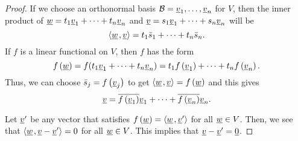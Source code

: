 \begin{proof}
If we choose an orthonormal basis $\mathcal{B} = \underline{v}_1, \ldots, \underline{v}_n$ for $V$, then the inner product of $\underline{w} = t_1 \underline{v}_1 + \cdots + t_n \underline{v}_n$ and $\underline{v} = s_1 \underline{v}_1 + \cdots + s_n \underline{v}_n$ will be
\begin{equation*}
{\left\langle  \underline{w}  \mskip2mu ,  \underline{v}  \right\rangle} = t_1 \bar{s}_1 + \cdots + t_n \bar{s}_n .
\end{equation*}
If $f$ is a linear functional on $V$, then $f$ has the form
\begin{equation*}
f \left(\underline{w}\right) = f(t_1 \underline{v}_1 + \cdots + t_n \underline{v}_n) = t_1 f \left( \underline{v}_1 \right) + \cdots + t_n f \left( \underline{v}_n \right).
\end{equation*}
Thus, we can choose $\bar{s}_j = f \left( \vecnot{v}_j \right)$ to get $ {\left\langle  \underline{w}  \mskip2mu ,  \underline{v}  \right\rangle} = f \left( \underline{w} \right)$ and this gives
\begin{equation*}
\underline{v} = \overline{ f \left( \underline{v}_1 \right) } \underline{v}_1 + \cdots + \overline{ f \left( \underline{v}_n \right) } \underline{v}_n .
\end{equation*}

Let $\underline{v}'$ be any vector that satisfies $f \left( \underline{w} \right) = {\left\langle  \underline{w}  \mskip2mu ,  \underline{v}'  \right\rangle}$ for all $\underline{w}\in V$.
Then, we see that ${\left\langle  \underline{w}  \mskip2mu ,  \underline{v} - \underline{v}'  \right\rangle} = 0$
for all $\underline{w}\in V$.
This implies that $\underline{v}-\underline{v}' = \underline{0}$.

\iffalse

Thus, the vector $\vecnot{v}$ is unique.
 for some fixed scalars $c_1, \ldots, c_n$ determined by the basis.
Clearly, $f \left( \vecnot{v}_j \right) = c_j$, which implies that $\bar{s}_j = f \left( \vecnot{v}_j \right)$.
That is, the vector $\vecnot{v}$ such that $f \left( \vecnot{w} \right) = \inner{ \vecnot{w} }{ \vecnot{v} }$ is

Note that the vector $\vecnot{v}$ lies in the orthogonal complement of the nullspace of $f$.
Let $W$ be the nullspace of $f$, then $V = W \oplus W^{\bot}$, and $f$ is completely determined by its value on $W^{\bot}$.
In fact, if $P$ gives the orthogonal projection of $V$ on $W^{\bot}$, then
\begin{equation*}
f \left( \vecnot{u} \right) = f \left( P \vecnot{u} \right)
\end{equation*}
for all $\vecnot{u} \in V$.
Suppose that $f \neq 0$, then $f$ is of rank one and $\dim \left( W^{\bot} \right) = 1$.
If $\vecnot{v}$ is any non-zero vector in $W^{\bot}$, it follows that
\begin{equation*}
P \vecnot{u} = \frac{ \inner{ \vecnot{u} }{ \vecnot{v} } }{ \left\| \vecnot{v} \right\|^2 } \vecnot{v}
\end{equation*}
for all $\vecnot{u} \in V$.
Thus,
\begin{equation*}
f \left( \vecnot{u} \right) = \inner{ \vecnot{u} }{ \vecnot{v} }
\frac{f \left( \vecnot{v} \right) }{ \left\| \vecnot{v} \right\|^2 }
\end{equation*}
for all $\vecnot{u} \in V$.
\fi

\end{proof}
